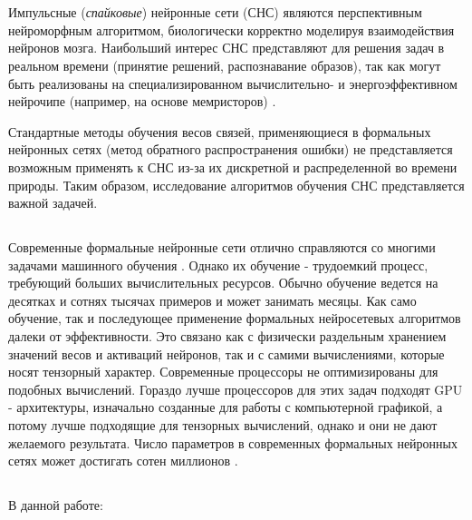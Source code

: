 \documentclass[a4paper]{article}
\begin{document}
\thispagestyle{empty}

\tableofcontents

\clearpage 

\section{}
Импульсные (\textit{спайковые}) нейронные сети (СНС) являются перспективным нейроморфным алгоритмом, биологически корректно моделируя взаимодействия нейронов мозга. Наибольший интерес СНС представляют для решения задач в реальном времени (принятие решений, распознавание образов), так как могут быть реализованы на специализированном вычислительно- и энергоэффективном нейрочипе (например, на основе мемристоров) \cite{hardware1, hardware2}.

Стандартные методы обучения весов связей, применяющиеся в формальных нейронных сетях (метод обратного распространения ошибки) не представляется возможным применять к СНС из-за их дискретной и распределенной во времени природы. Таким образом, исследование алгоритмов обучения СНС представляется важной задачей.

\subsection{}
Современные формальные нейронные сети отлично справляются со многими задачами машинного обучения \cite{pmlr-v28-wan13}. Однако их обучение - трудоемкий процесс, требующий больших вычислительных ресурсов. Обычно обучение ведется на десятках и сотнях тысячах примеров и может занимать месяцы. Как само обучение, так и последующее применение формальных нейросетевых алгоритмов далеки от эффективности. Это связано как с физически раздельным хранением значений весов и активаций нейронов, так и с самими вычислениями, которые носят тензорный характер. Современные процессоры не оптимизированы для подобных вычислений. Гораздо лучше процессоров для этих задач подходят GPU - архитектуры, изначально созданные для работы с компьютерной графикой, а потому лучше подходящие для тензорных вычислений, однако и они не дают желаемого результата. Число параметров в современных формальных нейронных сетях может достигать сотен миллионов \cite{ManyParams}.

\subsection{}
В данной работе:
\end{document}
